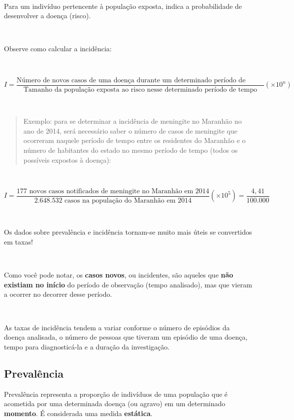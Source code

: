 \documentclass[
]{book}
\begin{document}
~

Para um indivíduo pertencente à população exposta, indica a probabilidade de desenvolver a doença (risco).

~

Observe como calcular a incidência:

~

\[
I=\frac{\text{Número de novos casos de uma doença durante um determinado período de tempo}}{\text{Tamanho da população exposta ao risco nesse determinado período de tempo}} (\times 10^{n})
\]

~

\begin{quote}
Exemplo: para se determinar a incidência de meningite no Maranhão no ano de 2014, será necessário saber o número de casos de meningite que ocorreram naquele período de tempo entre os residentes do Maranhão e o número de habitantes do estado no mesmo período de tempo (todos os possíveis expostos à doença):
\end{quote}

~

\[
I=\frac{\text{177 novos casos notificados de meningite no Maranhão em 2014}}{\text{2.648.532 casos na população do Maranhão em 2014}} (\times 10^{5}) = \frac{4,41}{100.000 }
\]

~

Os dados sobre prevalência e incidência tornam-se muito mais úteis se convertidos em taxas!

~

Como você pode notar, os \textbf{casos novos}, ou incidentes, são aqueles que \textbf{não existiam no início} do período de observação (tempo analisado), mas que vieram a ocorrer no decorrer desse período.

~

As taxas de incidência tendem a variar conforme o número de episódios da doença analisada, o número de pessoas que tiveram um episódio de uma doença, tempo para diagnosticá-la e a duração da investigação.

\hfill\break

\hypertarget{prevaluxeancia}{%
\subsection{Prevalência}\label{prevaluxeancia}}

\hfill\break

Prevalência representa a proporção de indivíduos de uma população que é acometida por uma determinada doença (ou agravo) em um determinado \textbf{momento}. É considerada uma medida \textbf{estática}.
\end{document}
